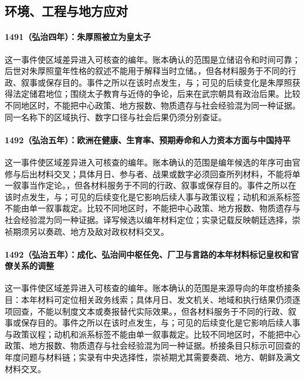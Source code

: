 \subsection{环境、工程与地方应对}

\paragraph{1491（弘治四年）：朱厚照被立为皇太子} 这一事件使区域差异进入可核查的编年。账本确认的范围是立储诏令和时间可靠；后世对朱厚照童年性格的叙述不能用于解释当时立储。，但各材料服务于不同的行政、叙事或保存目的。事件之所以在该时点发生，与；可见的后续变化是朱厚照获得法定储君地位；围绕太子教育与近侍的争论，后来在武宗朝具有政治后果。比较不同地区时，不能把中心政策、地方报数、物质遗存与社会经验混为同一种证据。同一名称下的区域执行、数字口径与社会后果仍须分别查证。

\paragraph{1492（弘治五年）：欧洲在健康、生育率、预期寿命和人力资本方面与中国持平} 这一事件使区域差异进入可核查的编年。账本确认的范围是编年候选的年序可由官修与后出材料交叉；具体月日、参与者、战果或数字必须回查所列材料，不能将单一叙事当作定论。，但各材料服务于不同的行政、叙事或保存目的。事件之所以在该时点发生，与；可见的后续变化是它影响后续人事与政策议程；动机和派系标签不能由单一叙事裁定。比较不同地区时，不能把中心政策、地方报数、物质遗存与社会经验混为同一种证据。译写候选以编年材料定位；实录记载反映朝廷选择，崇祯期须另以奏疏、地方及敌对政权材料交叉。

\paragraph{1492（弘治五年）：成化、弘治间中枢任免、厂卫与言路的本年材料标记皇权和官僚关系的调整} 这一事件使区域差异进入可核查的编年。账本确认的范围是来源导向的年度桥接条目：本年材料可定位相关政务线索；具体月日、发文机关、地域和执行结果仍须逐项回查，不能以制度文本或奏报替代实际效果。，但各材料服务于不同的行政、叙事或保存目的。事件之所以在该时点发生，与；可见的后续变化是它影响后续人事与政策议程；动机和派系标签不能由单一叙事裁定。比较不同地区时，不能把中心政策、地方报数、物质遗存与社会经验混为同一种证据。桥接条目只标示可回查的年度问题与材料链；实录有中央选择性，崇祯期尤其需要奏疏、地方、朝鲜及满文材料交叉。

